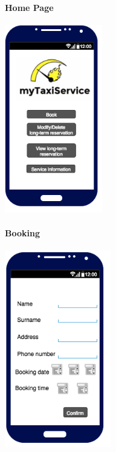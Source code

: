 		\paragraph{Home Page}
		\begin{center}
		    \includegraphics[width=0.32\textwidth]{./images/TELEFONO1User}
		\end{center}
		\paragraph{Booking}
		\begin{center}
		    \includegraphics[width=0.35\textwidth]{./images/TELEFONO2User}
		\end{center}

